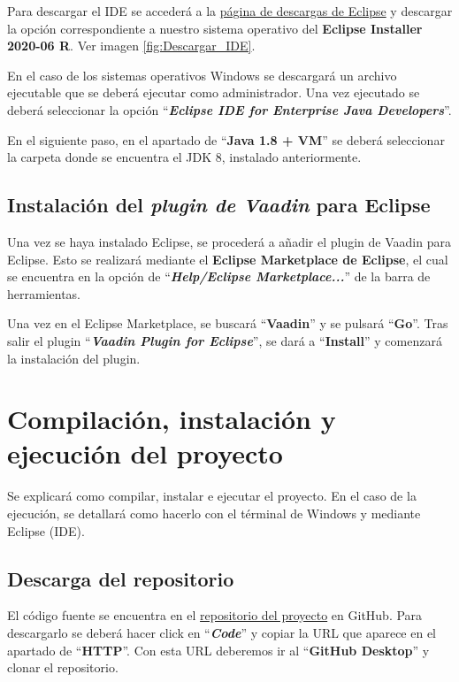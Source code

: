 Para descargar el IDE se accederá a la \href{https://www.eclipse.org/downloads/packages/release/2020-06/r}{página de descargas de Eclipse} y descargar la opción correspondiente a nuestro sistema operativo del \textbf{Eclipse Installer 2020-06 R}. Ver imagen \ref{fig:Descargar_IDE}.


En el caso de los sistemas operativos Windows se descargará un archivo ejecutable que se deberá ejecutar como administrador. Una vez ejecutado se deberá seleccionar la opción ``\textbf{\textit{Eclipse IDE for Enterprise Java Developers}}''. 

En el siguiente paso, en el apartado de ``\textbf{Java 1.8 + VM}'' se deberá seleccionar la carpeta donde se encuentra el JDK 8, instalado anteriormente.


\subsection{Instalación del \textit{plugin de Vaadin} para Eclipse}
Una vez se haya instalado Eclipse, se procederá a añadir el plugin de Vaadin para Eclipse. Esto se realizará mediante el \textbf{Eclipse Marketplace de Eclipse}, el cual se encuentra en la opción de ``\textbf{\textit{Help/Eclipse Marketplace...}}'' de la barra de herramientas.


Una vez en el Eclipse Marketplace, se buscará ``\textbf{Vaadin}'' y se pulsará ``\textbf{Go}''. Tras salir el plugin ``\textbf{\textit{Vaadin Plugin for Eclipse}}'', se dará a ``\textbf{Install}'' y comenzará la instalación del plugin.


\section{Compilación, instalación y ejecución del proyecto}
Se explicará como compilar, instalar e ejecutar el proyecto. En el caso de la ejecución, se detallará como hacerlo con el términal de Windows y mediante Eclipse (IDE).

\subsection{Descarga del repositorio}
El código fuente se encuentra en el \href{https://github.com/dbo1001/Gestor-TFG-2016}{repositorio del proyecto} en GitHub. Para descargarlo se deberá hacer click en ``\textbf{\textit{Code}}'' y copiar la URL que aparece en el apartado de ``\textbf{HTTP}''. Con esta URL deberemos ir al ``\textbf{GitHub Desktop}'' y clonar el repositorio.

